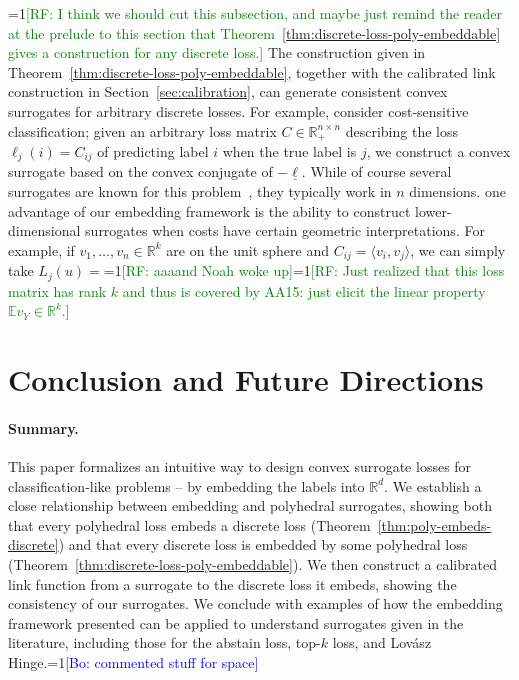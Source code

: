 \documentclass[12pt]{article}
\newcommand{\Comments}{1}
\newcommand{\mynote}[2]{\ifnum\Comments=1\textcolor{#1}{#2}\fi}
\newcommand{\raf}[1]{\mynote{green}{[RF: #1]}}
\newcommand{\bo}[1]{\mynote{blue}{[Bo: #1]}}
\newcommand{\reals}{\mathbb{R}}
\newcommand{\E}{\mathbb{E}}
\newcommand{\risk}[1]{\underline{#1}}
\newcommand{\inprod}[2]{\langle #1, #2 \rangle}%
\begin{document}
\raf{I think we should cut this subsection, and maybe just remind the reader at the prelude to this section that Theorem~\ref{thm:discrete-loss-poly-embeddable} gives a construction for any discrete loss.}
The construction given in Theorem~\ref{thm:discrete-loss-poly-embeddable}, together with the calibrated link construction in Section~\ref{sec:calibration}, can generate consistent convex surrogates for arbitrary discrete losses.
For example, consider cost-sensitive classification; given an arbitrary loss matrix $C \in \reals^{n\times n}_+$ describing the loss $\ell_j(i) = C_{ij}$ of predicting label $i$ when the true label is $j$, we construct a convex surrogate based on the convex conjugate of $-\risk{\ell}$.
While of course several surrogates are known for this problem~\cite{pires2013cost}, they typically work in $n$ dimensions.
one advantage of our embedding framework is the ability to construct lower-dimensional surrogates when costs have certain geometric interpretations.
For example, if $v_1,\ldots,v_n \in \reals^k$ are on the unit sphere and $C_{ij} = \inprod{v_i}{v_j}$, we can simply take $L_j(u) = $\raf{aaaand Noah woke up}\raf{Just realized that this loss matrix has rank $k$ and thus is covered by AA15: just elicit the linear property $\E v_Y \in \reals^k$.}

\section{Conclusion and Future Directions} \label{sec:conclusion}
\paragraph{Summary.}
This paper formalizes an intuitive way to design convex surrogate losses for classification-like problems -- by embedding the labels into $\reals^d$.
We establish a close relationship between embedding and polyhedral surrogates, showing both that every polyhedral loss embeds a discrete loss (Theorem~\ref{thm:poly-embeds-discrete}) and that every discrete loss is embedded by some polyhedral loss (Theorem~\ref{thm:discrete-loss-poly-embeddable}).
We then construct a calibrated link function from a surrogate to the discrete loss it embeds, showing the consistency of our surrogates.
We conclude with examples of how the embedding framework presented can be applied to understand surrogates given in the literature, including those for the abstain loss, top-$k$ loss, and Lov\'asz Hinge.\bo{commented stuff for space}
\end{document}
